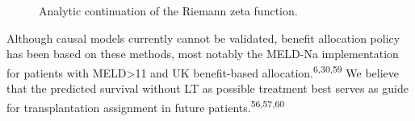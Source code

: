 \documentclass[11pt,english,]{book} %
\begin{document}
\begin{figure}

{\centering {}

}

\caption{Analytic continuation of the Riemann zeta function.}\label{fig:disc-fig4}
\end{figure}

Although causal models currently cannot be validated, benefit allocation policy has been based on these methods, most notably the MELD-Na implementation for patients with MELD\textgreater11 and UK benefit-based allocation.\textsuperscript{6,30,59} We believe that the predicted survival without LT as possible treatment best serves as guide for transplantation assignment in future patients.\textsuperscript{56,57,60}
\end{document}
